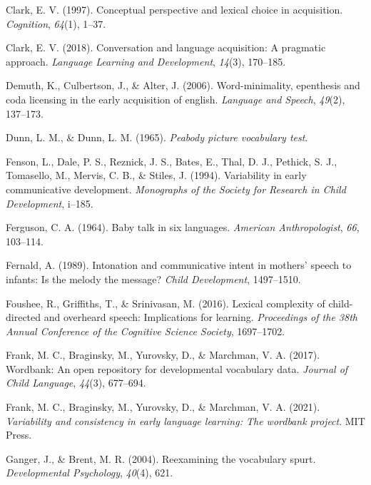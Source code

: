 \documentclass[10pt, letterpaper]{article}
\newenvironment{CSLReferences}%
  {}%
  {\par}
\begin{document}
\begin{CSLReferences}{1}{0}
\leavevmode\hypertarget{ref-clark1997conceptual}{}%
Clark, E. V. (1997). Conceptual perspective and lexical choice in
acquisition. \emph{Cognition}, \emph{64}(1), 1--37.

\leavevmode\hypertarget{ref-clark2018conversation}{}%
Clark, E. V. (2018). Conversation and language acquisition: A pragmatic
approach. \emph{Language Learning and Development}, \emph{14}(3),
170--185.

\leavevmode\hypertarget{ref-demuth2006word}{}%
Demuth, K., Culbertson, J., \& Alter, J. (2006). Word-minimality,
epenthesis and coda licensing in the early acquisition of english.
\emph{Language and Speech}, \emph{49}(2), 137--173.

\leavevmode\hypertarget{ref-dunn1965peabody}{}%
Dunn, L. M., \& Dunn, L. M. (1965). \emph{Peabody picture vocabulary
test}.

\leavevmode\hypertarget{ref-fenson1994variability}{}%
Fenson, L., Dale, P. S., Reznick, J. S., Bates, E., Thal, D. J.,
Pethick, S. J., Tomasello, M., Mervis, C. B., \& Stiles, J. (1994).
Variability in early communicative development. \emph{Monographs of the
Society for Research in Child Development}, i--185.

\leavevmode\hypertarget{ref-ferguson1964baby}{}%
Ferguson, C. A. (1964). Baby talk in six languages. \emph{American
Anthropologist}, \emph{66}, 103--114.

\leavevmode\hypertarget{ref-fernald1989intonation}{}%
Fernald, A. (1989). Intonation and communicative intent in mothers'
speech to infants: Is the melody the message? \emph{Child Development},
1497--1510.

\leavevmode\hypertarget{ref-foushee2016lexical}{}%
Foushee, R., Griffiths, T., \& Srinivasan, M. (2016). Lexical complexity
of child-directed and overheard speech: Implications for learning.
\emph{Proceedings of the 38th Annual Conference of the Cognitive Science
Society}, 1697--1702.

\leavevmode\hypertarget{ref-frank2017wordbank}{}%
Frank, M. C., Braginsky, M., Yurovsky, D., \& Marchman, V. A. (2017).
Wordbank: An open repository for developmental vocabulary data.
\emph{Journal of Child Language}, \emph{44}(3), 677--694.

\leavevmode\hypertarget{ref-frank2021variability}{}%
Frank, M. C., Braginsky, M., Yurovsky, D., \& Marchman, V. A. (2021).
\emph{Variability and consistency in early language learning: The
wordbank project}. MIT Press.

\leavevmode\hypertarget{ref-ganger2004reexamining}{}%
Ganger, J., \& Brent, M. R. (2004). Reexamining the vocabulary spurt.
\emph{Developmental Psychology}, \emph{40}(4), 621.


\end{CSLReferences}
\end{document}
